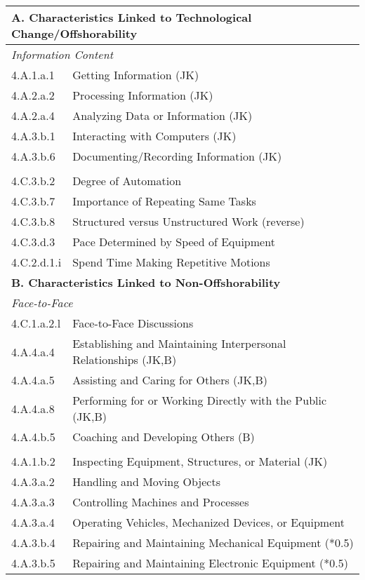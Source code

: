 \begin{tabular}{@{}ll@{}}
    \toprule
    \multicolumn{2}{l}{\textbf{A. Characteristics Linked to Technological Change/Offshorability}} \\
    \midrule
    \multicolumn{2}{l}{\textit{Information Content}} \\
    4.A.1.a.1   & Getting Information (JK) \\
    4.A.2.a.2   & Processing Information (JK) \\
    4.A.2.a.4   & Analyzing Data or Information (JK) \\
    4.A.3.b.1   & Interacting with Computers (JK) \\
    4.A.3.b.6   & Documenting/Recording Information (JK) \\
    
    \addlinespace
    \multicolumn{2}{l}{\textit{Automation/Routinization}} \\
    4.C.3.b.2   & Degree of Automation \\
    4.C.3.b.7   & Importance of Repeating Same Tasks \\
    4.C.3.b.8   & Structured versus Unstructured Work (reverse) \\
    4.C.3.d.3   & Pace Determined by Speed of Equipment \\
    4.C.2.d.1.i & Spend Time Making Repetitive Motions \\
    
    \midrule
    \multicolumn{2}{l}{\textbf{B. Characteristics Linked to Non-Offshorability}} \\
    \midrule
    \multicolumn{2}{l}{\textit{Face-to-Face}} \\
    4.C.1.a.2.l & Face-to-Face Discussions \\
    4.A.4.a.4   & Establishing and Maintaining Interpersonal Relationships (JK,B) \\
    4.A.4.a.5   & Assisting and Caring for Others (JK,B) \\
    4.A.4.a.8   & Performing for or Working Directly with the Public (JK,B) \\
    4.A.4.b.5   & Coaching and Developing Others (B) \\
    
    \addlinespace
    \multicolumn{2}{l}{\textit{On-Site Job}} \\
    4.A.1.b.2   & Inspecting Equipment, Structures, or Material (JK) \\
    4.A.3.a.2   & Handling and Moving Objects \\
    4.A.3.a.3   & Controlling Machines and Processes \\
    4.A.3.a.4   & Operating Vehicles, Mechanized Devices, or Equipment \\
    4.A.3.b.4   & Repairing and Maintaining Mechanical Equipment (*0.5) \\
    4.A.3.b.5   & Repairing and Maintaining Electronic Equipment (*0.5) \\
    

\end{tabular}
